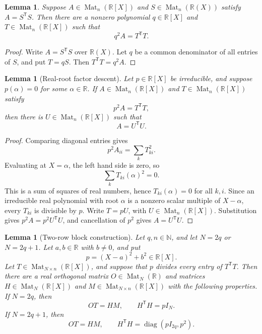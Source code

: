 \documentclass[uplatex,dvipdfmx]{jsarticle}
\newcommand{\Poly}{\mathbb{R}[X]}
\newcommand{\Frac}{\mathbb{R}(X)}
\newcommand{\Mat}{\operatorname{Mat}}
\theoremstyle{matrixsosdefinition}
\newtheorem{lemma}[theorem]{Lemma}
\begin{document}
\begin{lemma}\label{lem:clear-common-denominator-en}
  Suppose \(A\in\Mat_n(\Poly)\) and \(S\in\Mat_n(\Frac)\) satisfy
  \(A=S^{\mathsf T}S\). Then there are a nonzero polynomial \(q\in\Poly\) and
  \(T\in\Mat_n(\Poly)\) such that
  \[
    q^2A=T^{\mathsf T}T.
  \]
\end{lemma}

\begin{proof}
  Write \(A=S^{\mathsf T}S\) over \(\Frac\). Let \(q\) be a common denominator
  of all entries of \(S\), and put \(T=qS\). Then
  \(T^{\mathsf T}T=q^2A\).
\end{proof}

\begin{lemma}[Real-root factor descent]\label{lem:real-root-factor-descent-en}
  Let \(p\in\Poly\) be irreducible, and suppose \(p(\alpha)=0\) for some
  \(\alpha\in\mathbb{R}\).  If \(A\in\Mat_n(\Poly)\) and
  \(T\in\Mat_n(\Poly)\) satisfy
  \[
    p^2A=T^{\mathsf T}T,
  \]
  then there is \(U\in\Mat_n(\Poly)\) such that
  \[
    A=U^{\mathsf T}U.
  \]
\end{lemma}

\begin{proof}
  Comparing diagonal entries gives
  \[
    p^2A_{ii}=\sum_k T_{ki}^2.
  \]
  Evaluating at \(X=\alpha\), the left hand side is zero, so
  \[
    \sum_k T_{ki}(\alpha)^2=0.
  \]
  This is a sum of squares of real numbers, hence \(T_{ki}(\alpha)=0\) for all
  \(k,i\).  Since an irreducible real polynomial with root \(\alpha\) is a
  nonzero scalar multiple of \(X-\alpha\), every \(T_{ki}\) is divisible by
  \(p\).  Write \(T=pU\), with
  \(U\in\Mat_n(\Poly)\).  Substitution gives
  \(p^2A=p^2U^{\mathsf T}U\), and cancellation of \(p^2\) gives
  \(A=U^{\mathsf T}U\).
\end{proof}

\begin{lemma}[Two-row block construction]\label{lem:two-row-block-construction-en}
  Let \(q,n\in\mathbb{N}\), and let \(N=2q\) or \(N=2q+1\).
  Let \(a,b\in\mathbb{R}\) with \(b\ne0\), and put
  \[
    p=(X-a)^2+b^2\in\Poly.
  \]
  Let \(T\in\Mat_{N\times n}(\Poly)\), and suppose that \(p\) divides every
  entry of \(T^{\mathsf T}T\).
  Then there are a real orthogonal matrix \(O\in\Mat_N(\mathbb{R})\) and
  matrices \(H\in\Mat_N(\Poly)\) and \(M\in\Mat_{N\times n}(\Poly)\) with the
  following properties.  If \(N=2q\), then
  \[
    OT=HM,\qquad H^{\mathsf T}H=pI_N.
  \]
  If \(N=2q+1\), then
  \[
    OT=HM,\qquad
    H^{\mathsf T}H=\operatorname{diag}(pI_{2q},p^2).
  \]
\end{lemma}
\end{document}
